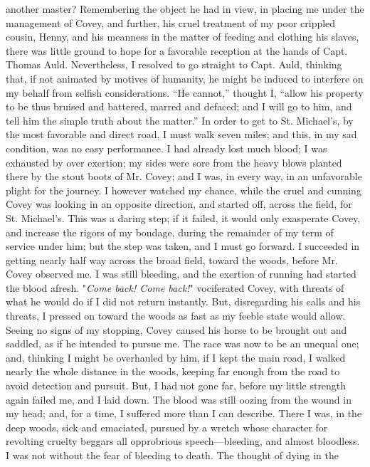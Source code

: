 another master? Remembering the object he had in view, in placing me
under the management of Covey, and further, his cruel treatment of my
poor crippled cousin, Henny, and his meanness in the matter of feeding
and clothing his slaves, there was little ground to hope for a favorable
reception at the hands of Capt. Thomas Auld. Nevertheless, I resolved to
go straight to Capt. Auld, thinking that, if not animated by motives of
humanity, he might be induced to interfere on my behalf from selfish
considerations. ``He cannot,'' thought I, ``allow his property to be
thus bruised and battered, marred and defaced; and I will go to him, and
tell him the simple truth about the matter.'' In order to get to St.
Michael's, by the most favorable and direct road, I must walk seven
miles; and this, in my sad condition, was no easy performance. I had
already lost much blood; I was exhausted by over exertion; my sides were
sore from the heavy blows planted there by the stout boots of Mr. Covey;
and I was, in every way, in an unfavorable plight for the journey. I
however watched my chance, while the cruel and
{\protect\hypertarget{227}{}{}}cunning Covey was looking in an opposite
direction, and started off, across the field, for St. Michael's. This
was a daring step; if it failed, it would only exasperate Covey, and
increase the rigors of my bondage, during the remainder of my term of
service under him; but the step was taken, and I must go forward. I
succeeded in getting nearly half way across the broad field, toward the
woods, before Mr. Covey observed me. I was still bleeding, and the
exertion of running had started the blood afresh. "\emph{Come back! Come
back!}" vociferated Covey, with threats of what he would do if I did not
return instantly. But, disregarding his calls and his threats, I pressed
on toward the woods as fast as my feeble state would allow. Seeing no
signs of my stopping, Covey caused his horse to be brought out and
saddled, as if he intended to pursue me. The race was now to be an
unequal one; and, thinking I might be overhauled by him, if I kept the
main road, I walked nearly the whole distance in the woods, keeping far
enough from the road to avoid detection and pursuit. But, I had not gone
far, before my little strength again failed me, and I laid down. The
blood was still oozing from the wound in my head; and, for a time, I
suffered more than I can describe. There I was, in the deep woods, sick
and emaciated, pursued by a wretch whose character for revolting cruelty
beggars all opprobrious speech---bleeding, and almost bloodless. I was
not without the fear of bleeding to death. The thought of dying in the
